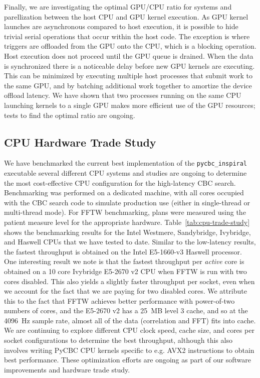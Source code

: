 Finally, we are investigating the optimal GPU/CPU ratio for systems and
parellization between the host CPU and GPU kernel execution. As GPU kernel
launches are asynchronous compared to host execution, it is possible to hide
trivial serial operations that occur within the host code. The exception is
where triggers are offloaded from the GPU onto the CPU, which is a blocking
operation. Host execution does not proceed until the GPU queue is drained.
When the data is synchronized there is a noticeable delay before new GPU
kernels are executing. This can be minimized by executing multiple host
processes that submit work to the same GPU, and by batching additional work
together to amortize the device offload latency. We have shown that two
processes running on the same CPU launching kernels to a single GPU makes more
efficient use of the GPU resources; tests to find the optimal ratio are
ongoing.

\vspace*{-10pt}
\subsection{CPU Hardware Trade Study}
\vspace*{-05pt}
\label{sec:cpu-trade}

We have benchmarked the current best implementation of the
\texttt{pycbc\_inspiral} executable several different CPU systems and studies
are ongoing to determine the most cost-effective CPU configuration for the
high-latency CBC search. Benchmarking was performed on a dedicated machine,
with all cores occupied with the CBC search code to simulate production use
(either in single-thread or multi-thread mode). For FFTW benchmarking, plans
were measured using the patient measure level for the appropriate hardware.
Table~\ref{tab:cpu-trade-study} shows the benchmarking results for the Intel
Westmere, Sandybridge, Ivybridge, and Haswell CPUs that we have tested to
date. Similar to the low-latency results, the fastest throughput is obtained
on the Intel E5-1660-v3 Haswell processor. One interesting result we note
is that the fastest throughput per \emph{active} core is obtained on a 10 core
Ivybridge E5-2670 v2 CPU when FFTW is run with two cores disabled. This also
yields a slightly faster throughput per socket, even when we account for the
fact that we are paying for two disabled cores. We attribute this to the fact
that FFTW achieves better performance with power-of-two numbers of cores, and
the E5-2670 v2 has a 25~MB level 3 cache, and so at the 4096~Hz sample rate,
almost all of the data (correlation and FFT) fits into cache. We are
continuing to explore different CPU clock speed, cache size, and cores per
socket configurations to determine the best throughput, although this also
involves writing PyCBC CPU kernels specific to e.g. AVX2 instructions to
obtain best performance. These optimization efforts are ongoing as part of our
software improvements and hardware trade study.

